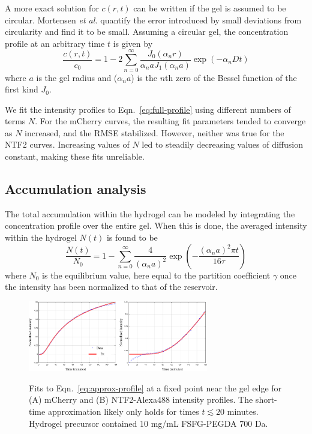 A more exact solution for $c(r,t)$ can be written if the gel is assumed to be circular.  Mortensen \textit{et al.} quantify the error introduced by small deviations from circularity and find it to be small.  Assuming a circular gel, the concentration profile at an arbitrary time $t$ is given by
\begin{equation}
\frac{c(r,t)}{c_0} = 1 - 2\sum_{n=0}^\infty \frac{J_0(\alpha_n r)}{\alpha_n a J_1(\alpha_n a)}\exp(-\alpha_n D t)
\label{eq:full-profile}
\end{equation}
where $a$ is the gel radius and ($\alpha_n a$) is the $n$th zero of the Bessel function of the first kind $J_0$.

We fit the intensity profiles to Eqn.~\ref{eq:full-profile} using different numbers of terms $N$.  For the mCherry curves, the resulting fit parameters tended to converge as $N$ increased, and the RMSE stabilized.  However, neither was true for the NTF2 curves.  Increasing values of $N$ led to steadily decreasing values of diffusion constant, making these fits unreliable.

\subsection{Accumulation analysis}

The total accumulation within the hydrogel can be modeled by integrating the concentration profile over the entire gel.  When this is done, the averaged intensity within the hydrogel $N(t)$ is found to be
\begin{equation}
\frac{N(t)}{N_0} = 1-\sum_{n=0}^\infty \frac{4}{(\alpha_na)^2}\exp\left(-\frac{(\alpha_na)^2\pi t}{16\tau}\right)
\label{eq:full-accumulation}
\end{equation} where $N_0$ is the equilibrium value, here equal to the partition coefficient $\gamma$ once the intensity has been normalized to that of the reservoir.

\begin{figure}
\caption[Fits to concentration profiles at a fixed position.]{Fits to Eqn.~\ref{eq:approx-profile} at a fixed point near the gel edge for (A) mCherry and (B) NTF2-Alexa488 intensity profiles.  The short-time approximation likely only holds for times $t \lesssim 20$ minutes. Hydrogel precursor contained 10 mg/mL FSFG-PEGDA 700 Da.}
\centering
\includegraphics[width=0.7\textwidth]{figs/ch04/erfc-time.pdf}
\label{fig:erfc-time}
\end{figure} 


